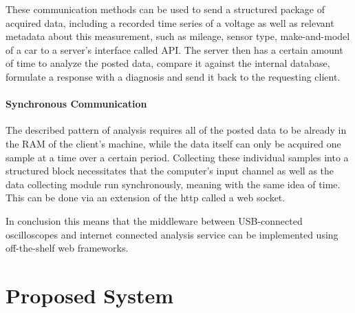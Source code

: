 These communication methods can be used to send a structured package of acquired data, including a recorded time series of a voltage as well as relevant metadata about this measurement, 
such as mileage, sensor type, make-and-model of a car to a server’s interface called API. 
The server then has a certain amount of time to analyze the posted data, compare it against the internal database, formulate a response with a diagnosis and send it back to the requesting client.

\paragraph{Synchronous Communication}
The described pattern of analysis requires all of the posted data to be already in the RAM of the client’s machine, while the data itself can only be acquired one sample at a time over a certain period. 
Collecting these individual samples into a structured block necessitates that the computer’s input channel as well as the data collecting module run synchronously, meaning with the same idea of time. 
This can be done via an extension of the http called a web socket.

In conclusion this means that the middleware between USB-connected oscilloscopes and internet connected analysis service can be implemented using off-the-shelf web frameworks.

\section{Proposed System}
